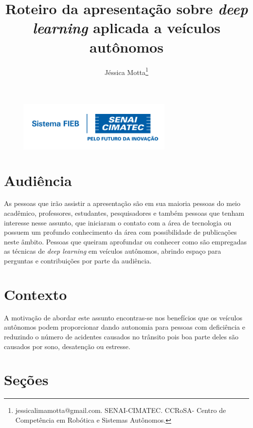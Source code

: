 \documentclass[12pt,a4paper]{article}
\begin{document}
 
\begin{figure}
    \flushright
    \includegraphics[scale=0.5]{Logo_senai.png}
\end{figure}

\title{Roteiro da apresentação sobre \emph{deep learning} aplicada a veículos autônomos}
\author{Jéssica Motta\thanks{jessicalimamotta@gmail.com. SENAI-CIMATEC. CCRoSA- Centro de Competência em Robótica e Sistemas Autônomos.}}
 

    \maketitle
    \singlespacing

    \section{Audiência}

    \par As pessoas que irão assistir a apresentação são em sua maioria pessoas do meio acadêmico, professores, estudantes, pesquisadores e também pessoas que tenham interesse nesse assunto, que iniciaram o contato com a área de tecnologia ou possuem um profundo conhecimento da área com possibilidade de publicações neste âmbito. Pessoas que queiram aprofundar ou conhecer como são empregadas as técnicas de \emph{deep learning} em veículos autônomos, abrindo espaço para perguntas e contribuições por parte da audiência.

    \section{Contexto}
    \par A motivação de abordar este assunto encontras-se nos benefícios que os veículos autônomos podem proporcionar dando autonomia para pessoas com deficiência e reduzindo o número de acidentes causados no trânsito pois boa parte deles são causados por sono, desatenção ou estresse.
  

    \section{Seções}
\end{document}
